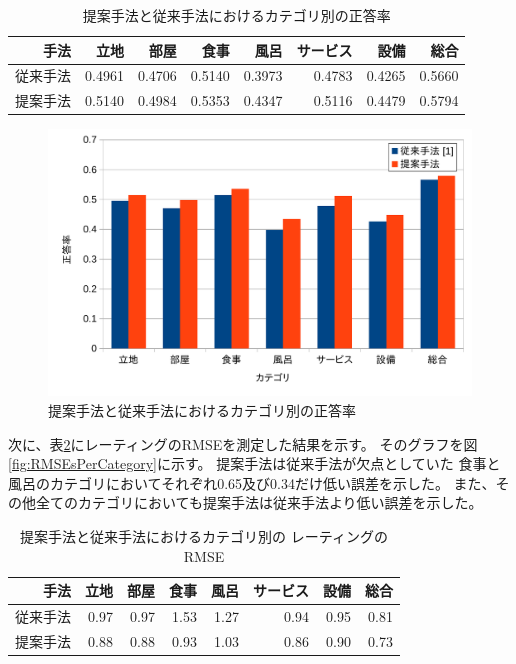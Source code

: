 \begin{table}
  \caption{提案手法と従来手法\cite{fujitani15}におけるカテゴリ別の正答率}
  \centering
  \begin{tabular}{r | r r r r r r r} \label{tab:AccuraciesPerCategory}
    手法 & 立地 & 部屋 & 食事 & 風呂 & サービス & 設備 & 総合 \\
    \hline
    従来手法\cite{fujitani15}
        & 0.4961 & 0.4706 & 0.5140 & 0.3973 & 0.4783 & 0.4265 & 0.5660 \\
    提案手法 & 0.5140 & 0.4984 & 0.5353 & 0.4347 & 0.5116 & 0.4479 & 0.5794 \\
  \end{tabular}
\end{table}

\begin{figure}
  \includegraphics{fig/graph_of_accuracies_per_category.pdf}
  \caption{提案手法と従来手法\cite{fujitani15}におけるカテゴリ別の正答率}
  \label{fig:AccuraciesPerCategory}
\end{figure}

次に、表\ref{tab:RMSEsPerCategory}にレーティングのRMSEを測定した結果を示す。
そのグラフを図\ref{fig:RMSEsPerCategory}に示す。
提案手法は従来手法が欠点としていた
食事と風呂のカテゴリにおいてそれぞれ0.65及び0.34だけ低い誤差を示した。
また、その他全てのカテゴリにおいても提案手法は従来手法より低い誤差を示した。

\begin{table}
  \caption{提案手法と従来手法\cite{fujitani15}におけるカテゴリ別の
           レーティングのRMSE}
  \centering
  \begin{tabular}{r | r r r r r r r} \label{tab:RMSEsPerCategory}
    手法 & 立地 & 部屋 & 食事 & 風呂 & サービス & 設備 & 総合 \\
    \hline
    従来手法\cite{fujitani15}
        & 0.97 & 0.97 & 1.53 & 1.27 & 0.94 & 0.95 & 0.81 \\
    提案手法 & 0.88 & 0.88 & 0.93 & 1.03 & 0.86 & 0.90 & 0.73 \\
  \end{tabular}
\end{table}

